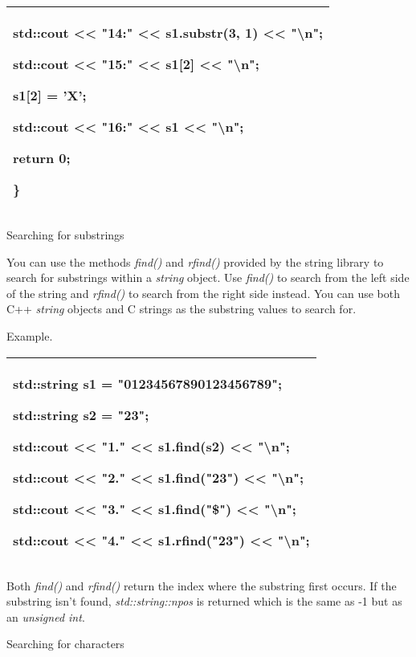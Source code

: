 \documentclass[
]{article}
\begin{document}
\begin{longtable}[]{@{}l@{}}
\begin{minipage}[t]{0.97\columnwidth}
std::cout \textless\textless{} "14:" \textless\textless{} s1.substr(3,
1) \textless\textless{} "\textbackslash n";

std::cout \textless\textless{} "15:" \textless\textless{} s1{[}2{]}
\textless\textless{} "\textbackslash n";

s1{[}2{]} = 'X';

std::cout \textless\textless{} "16:" \textless\textless{} s1
\textless\textless{} "\textbackslash n";

return 0;

\}\strut
\end{minipage}\tabularnewline
\bottomrule
\end{longtable}

Searching for substrings

You can use the methods \emph{find()} and \emph{rfind()} provided by the
string library to search for substrings within a \emph{string} object.
Use \emph{find()} to search from the left side of the string and
\emph{rfind()} to search from the right side instead. You can use both
C++ \emph{string} objects and C strings as the substring values to
search for.

Example.

\begin{longtable}[]{@{}l@{}}
\toprule
\endhead
\begin{minipage}[t]{0.97\columnwidth}\raggedright
std::string s1 = "01234567890123456789";

std::string s2 = "23";

std::cout \textless\textless{} "1." \textless\textless{} s1.find(s2)
\textless\textless{} "\textbackslash n";

std::cout \textless\textless{} "2." \textless\textless{} s1.find("23")
\textless\textless{} "\textbackslash n";

std::cout \textless\textless{} "3." \textless\textless{} s1.find("\$")
\textless\textless{} "\textbackslash n";

std::cout \textless\textless{} "4." \textless\textless{} s1.rfind("23")
\textless\textless{} "\textbackslash n";\strut
\end{minipage}\tabularnewline
\bottomrule
\end{longtable}

Both \emph{find()} and \emph{rfind()} return the index where the
substring first occurs. If the substring isn't found,
\emph{std::string::npos} is returned which is the same as -1 but as an
\emph{unsigned int}.

Searching for characters
\end{document}
